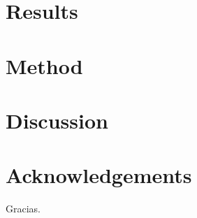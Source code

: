 \documentclass{emulateapj}
\begin{document}
\section{Results}
\label{Results}

\section{Method}
\label{Method}




\section{Discussion} 
\section{Acknowledgements}
Gracias.

\end{document}
